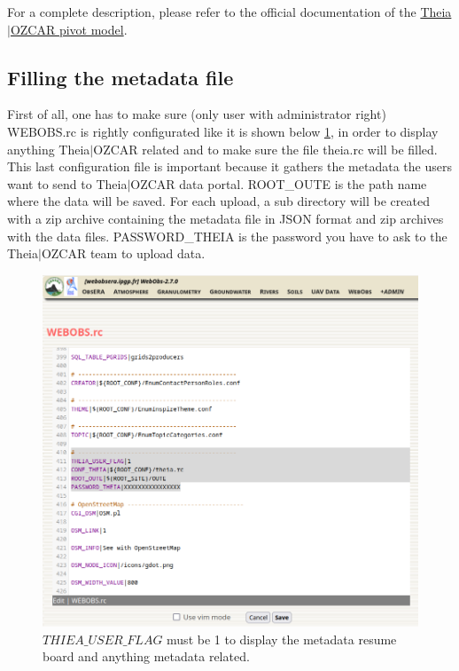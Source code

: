 For a complete description, please refer to the official documentation of the \href{https://theia-ozcar.gricad-pages.univ-grenoble-alpes.fr/doc-producer/producer-documentation.html#modele-de-donnees-pivot}{Theia$\vert$OZCAR pivot model}.

\subsection{Filling the metadata file}
First of all, one has to make sure (only user with administrator right) WEBOBS.rc is rightly configurated like it is shown below \ref{webobs.rc}, in order to display anything Theia$\vert$OZCAR related and to make sure the file theia.rc will be filled. This last configuration file is important because it gathers the metadata the users want to send to Theia$\vert$OZCAR data portal. ROOT\_OUTE is the path name where the data will be saved. For each upload, a sub directory will be created with a zip archive containing the metadata file in JSON format and zip archives with the data files. PASSWORD\_THEIA is the password you have to ask to the Theia$\vert$OZCAR team to upload data.

\begin{figure}[!h]
	\centering
	\includegraphics[width=\textwidth]{figures/theia/webobs.rc.png}
	\caption{$THIEA\_USER\_FLAG$ must be 1 to display the metadata resume board and anything metadata related.}
	\label{webobs.rc}
\end{figure}

